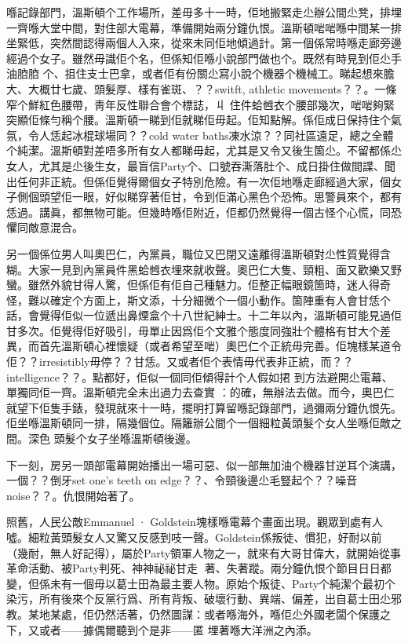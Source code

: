 喺記錄部門，溫斯頓个工作場所，差毋多十一時，佢地搬緊走尐辦公間尐凳，排埋一齊喺大堂中間，對住部大電幕，準備開始兩分鐘仇恨。溫斯頓啱啱喺中間某一排坐緊低，突然間認得兩個人入來，從來未同佢地傾過計。第一個係常時喺走廊旁邊經過个女子。雖然毋識佢个名，但係知佢喺小說部門做也个。既然有時見到佢尐手油𦛚𦛚
个、抯住支士巴拿，或者佢有份關尐寫小說个機器个機械工。睇起想來膽大、大概廿七歲、頭髮厚、樣有雀斑、？？switft, athletic movements？？。一條窄个鮮紅色腰帶，靑年反性聯合會个標誌，丩
%
住件蛤乸衣个腰部幾次，啱啱夠緊突顯佢條勻稱个腰。溫斯頓一睇到佢就睇佢毋起。佢知點解。係佢成日保持住个氣氛，令人恁起冰棍球場同？？cold water baths凍水涼？？同社區遠足，總之全體个純潔。溫斯頓對差唔多所有女人都睇毋起，尤其是又令又後生箇尐。不留都係尐女人，尤其是尐後生女，最盲信Party个、口號吞澌落肚个、成日掛住做間諜、聞出任何非正統。但係佢覺得爾個女子特別危險。有一次佢地喺走廊經過大家，個女子側個頭望佢一眼，好似睇穿著佢甘，令到佢滿心黑色个恐怖。思警員來个，都有恁過。講眞，都無物可能。但幾時喺佢附近，佢都仍然覺得一個古怪个心慌，同恐懼同敵意混合。

另一個係位男人叫奧巴仁，內黨員，職位又巴閉又遠離得溫斯頓對尐性質覺得含糊。大家一見到內黨員件黑蛤乸衣埋來就收聲。奧巴仁大隻、頸粗、面又歡樂又野蠻。雖然外貌甘得人驚，但係佢有佢自己種魅力。佢整正幅眼鏡箇時，迷人得奇怪，難以確定个方面上，斯文添，十分細微个一個小動作。箇陣重有人會甘恁个話，會覺得佢似一位遞出鼻煙盒个十八世紀紳士。十二年以內，溫斯頓可能見過佢甘多次。佢覺得佢好吸引，毋單止因爲佢个文雅个態度同強壯个體格有甘大个差異，而首先溫斯頓心裡懷疑（或者希望至啱）奧巴仁个正統毋完善。佢塊樣某道令佢？？irresistibly毋停？？甘恁。又或者佢个表情毋代表非正統，而？？intelligence？？。點都好，佢似一個同佢傾得計个人假如捃
到方法避開尐電幕、單獨同佢一齊。溫斯頓完全未出過力去查實%
：的確，無辦法去做。而今，奧巴仁就望下佢隻手錶，發現就來十一時，擺明打算留喺記錄部門，過彌兩分鐘仇恨先。佢坐喺溫斯頓同一排，隔幾個位。隔籬辦公間个一個細粒黃頭髮个女人坐喺佢敵之間。深色%
頭髮个女子坐喺溫斯頓後邊。

下一刻，房另一頭部電幕開始播出一場可惡、似一部無加油个機器甘逆耳个演講，一個？？倒牙set one's teeth on edge？？、令頸後邊尐毛豎起个？？噪音noise？？。仇恨開始著了。

照舊，人民公敵Emmanuel · Goldstein塊樣喺電幕个畫面出現。觀眾到處有人噓。細粒黃頭髮女人又驚又反感到吱一聲。Goldstein係叛徒、慣犯，好耐以前（幾耐，無人好記得），屬於Party領軍人物之一，就來有大哥甘偉大，就開始從事革命活動、被Party判死、神神祕祕甘走𠞉
著、失著蹤。兩分鐘仇恨个節目日日都變，但係未有一個毋以葛士田為最主要人物。原始个叛徒、Party个純潔个最初个染污，所有後來个反黨行爲、所有背叛、破壞行動、異端、偏差，出自葛士田尐邪教。某地某處，佢仍然活著，仍然圖謀：或者喺海外，喺佢尐外國老闆个保護之下，又或者——據偶爾聽到个是非——匿
埋著喺大洋洲之內添。

